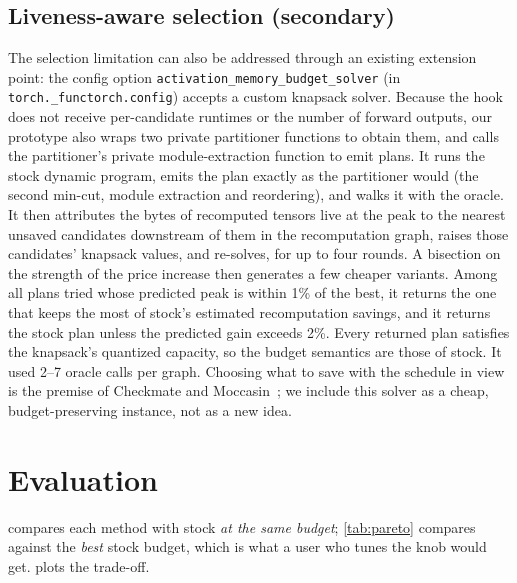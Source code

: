 \documentclass[10pt]{article}
\newcommand{\code}[1]{\texttt{#1}}
\begin{document}
\subsection{Liveness-aware selection (secondary)}
\label{sec:solver}
The selection limitation can also be addressed through an existing extension point: the config option
\code{activation\_memory\_budget\_solver} (in \code{torch.\_functorch.config}) accepts a custom knapsack solver. Because the
hook does not receive per-candidate runtimes or the number of forward outputs, our prototype also wraps two private
partitioner functions to obtain them, and calls the partitioner's private module-extraction function to emit plans.
It runs the stock dynamic program, emits the plan exactly as the partitioner would (the second min-cut, module extraction
and reordering), and walks it with the oracle. It then attributes the bytes of recomputed tensors live at the peak to the
nearest unsaved candidates downstream of them in the recomputation graph, raises those candidates' knapsack values, and
re-solves, for up to four rounds. A bisection on the strength of the price increase then generates a few cheaper
variants. Among all plans tried whose predicted peak is within 1\% of the best, it returns the one that keeps the most
of stock's estimated recomputation savings, and it returns the stock plan unless the predicted gain exceeds 2\%.
Every returned plan satisfies the knapsack's quantized capacity, so the budget semantics are those of stock. It used 2--7
oracle calls per graph. Choosing what to save with the schedule in view is the premise of Checkmate and
Moccasin~\citep{jain2020checkmate,bartan2023moccasin}; we include this solver as a cheap, budget-preserving instance,
not as a new idea.

\section{Evaluation}
\label{sec:eval}

 compares each method with stock \emph{at the same budget}; \cref{tab:pareto} compares against the
\emph{best} stock budget, which is what a user who tunes the knob would get.  plots the trade-off.

\begin{table}[t]
\centering
\small
\caption{Peak memory change versus stock at the same budget, in \%, with step-time change in parentheses. Stock peak in
MB. ``Drift'' is the step-time difference between stock and a stock re-run at the end of the case (\%).
Ind.\ = Inductor; eager = \code{aot\_eager}, a partitioner-only ablation. ``Light'' = use-site rematerialization without
matrix multiplies or attention. BERT rows are measured with the dropout fix of \cref{sec:rng} emulated. The pass never
duplicates random ops (\cref{sec:remat}); an earlier version that did is excluded (\cref{sec:samebudget}).
$^\dagger$This solver plan gives incorrect gradients, caused by PyTorch issue \#198333 (\cref{sec:correctness}); both
rows that use it are excluded from all claims.}
\label{tab:main}
\setlength{\tabcolsep}{4pt}

\end{table}
\end{document}

